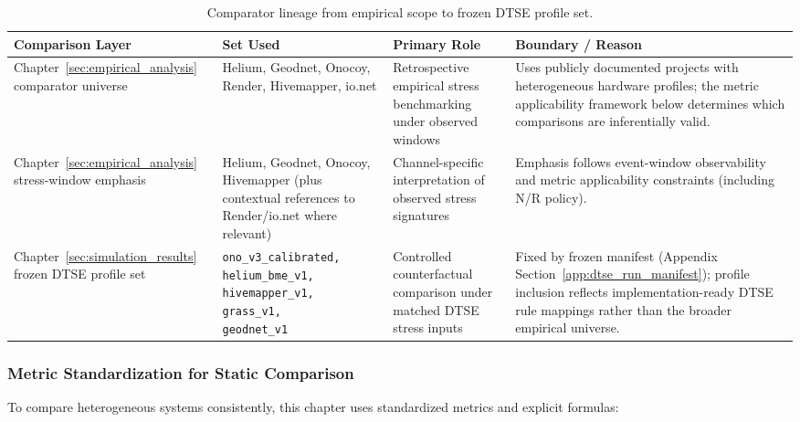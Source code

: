 \begin{table}[ht]
    \centering
    \footnotesize
    \renewcommand{\arraystretch}{1.2}
    \setlength{\tabcolsep}{4pt}
    \begin{tabularx}{\textwidth}{@{}>{\raggedright\arraybackslash}p{}>{\raggedright\arraybackslash}p{}>{\raggedright\arraybackslash}p{}X@{}}
        \toprule
        \textbf{Comparison Layer} & \textbf{Set Used} & \textbf{Primary Role} & \textbf{Boundary / Reason} \\
        \midrule
        Chapter~\ref{sec:empirical_analysis} comparator universe &
        Helium, Geodnet, Onocoy, Render, Hivemapper, io.net &
        Retrospective empirical stress benchmarking under observed windows &
        Uses publicly documented projects with heterogeneous hardware profiles; the metric applicability framework below determines which comparisons are inferentially valid. \\
        \addlinespace
        Chapter~\ref{sec:empirical_analysis} stress-window emphasis &
        Helium, Geodnet, Onocoy, Hivemapper (plus contextual references to Render/io.net where relevant) &
        Channel-specific interpretation of observed stress signatures &
        Emphasis follows event-window observability and metric applicability constraints (including N/R policy). \\
        \addlinespace
        Chapter~\ref{sec:simulation_results} frozen DTSE profile set &
        \shortstack[l]{\texttt{ono\_v3\_calibrated,}\\\texttt{helium\_bme\_v1,}\\\texttt{hivemapper\_v1,}\\\texttt{grass\_v1,}\\\texttt{geodnet\_v1}} &
        Controlled counterfactual comparison under matched DTSE stress inputs &
        Fixed by frozen manifest (Appendix Section~\ref{app:dtse_run_manifest}); profile inclusion reflects implementation-ready DTSE rule mappings rather than the broader empirical universe. \\
        \bottomrule
    \end{tabularx}
    \caption{Comparator lineage from empirical scope to frozen DTSE profile set.}
    \label{tab:comparator_lineage_funnel}
\end{table}

\subsubsection{Metric Standardization for Static Comparison}
To compare heterogeneous systems consistently, this chapter uses standardized metrics and explicit formulas:

